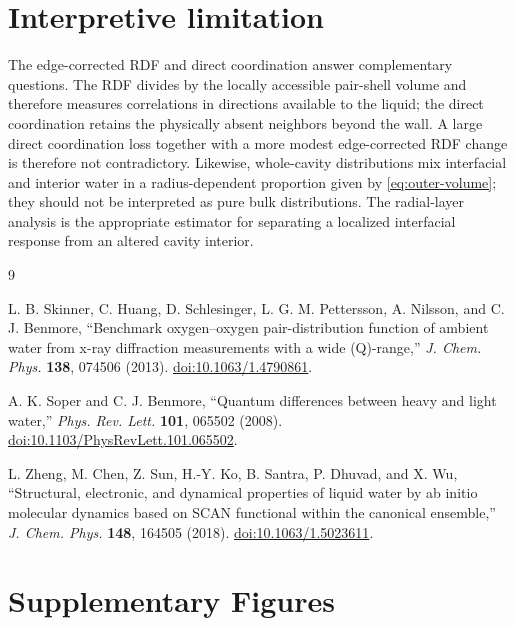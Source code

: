 \documentclass[11pt]{article}
\begin{document}
\section{Interpretive limitation}

The edge-corrected RDF and direct coordination answer complementary questions.
The RDF divides by the locally accessible pair-shell volume and therefore
measures correlations in directions available to the liquid; the direct
coordination retains the physically absent neighbors beyond the wall.  A
large direct coordination loss together with a more modest edge-corrected RDF
change is therefore not contradictory.  Likewise, whole-cavity distributions
mix interfacial and interior water in a radius-dependent proportion given by
\cref{eq:outer-volume}; they should not be interpreted as pure bulk
distributions.  The radial-layer analysis is the appropriate estimator for
separating a localized interfacial response from an altered cavity interior.

\begin{thebibliography}{9}

L. B. Skinner, C. Huang, D. Schlesinger, L. G. M. Pettersson,
A. Nilsson, and C. J. Benmore,
``Benchmark oxygen--oxygen pair-distribution function of ambient water
from x-ray diffraction measurements with a wide (Q)-range,''
\emph{J. Chem. Phys.} \textbf{138}, 074506 (2013).
\href{https://doi.org/10.1063/1.4790861}{doi:10.1063/1.4790861}.

A. K. Soper and C. J. Benmore,
``Quantum differences between heavy and light water,''
\emph{Phys. Rev. Lett.} \textbf{101}, 065502 (2008).
\href{https://doi.org/10.1103/PhysRevLett.101.065502}{doi:10.1103/PhysRevLett.101.065502}.

L. Zheng, M. Chen, Z. Sun, H.-Y. Ko, B. Santra, P. Dhuvad, and X. Wu,
``Structural, electronic, and dynamical properties of liquid water by ab
initio molecular dynamics based on SCAN functional within the canonical
ensemble,'' \emph{J. Chem. Phys.} \textbf{148}, 164505 (2018).
\href{https://doi.org/10.1063/1.5023611}{doi:10.1063/1.5023611}.

\end{thebibliography}

\clearpage
\appendix
\renewcommand{\figurename}{Supplementary Figure}
\section{Supplementary Figures}
\end{document}
